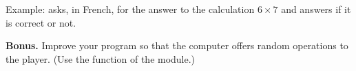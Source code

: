 \documentclass[11pt,class=report,crop=false]{standalone}
\begin{document}
\begin{activite}
\begin{enumerate}
\begin{enumerate}
\begin{fonction}
  \medskip
    
  Example:  asks, in French, for the answer to the calculation $6 \times 7$ and answers if it is correct or not.
  \end{fonction}     
    
  \end{enumerate}
  
  
  \textbf{Bonus.} Improve your program so that the computer offers random operations to the player. (Use the  function of the  module.)
  
\end{enumerate}
\end{activite}




\end{document}
